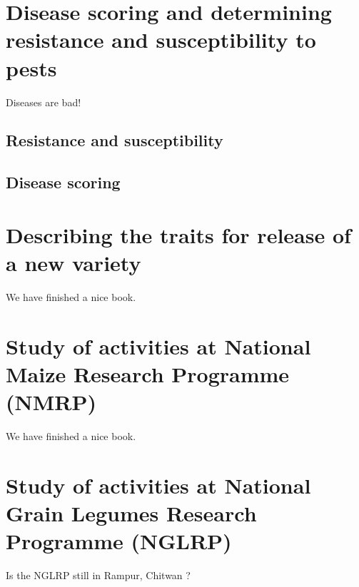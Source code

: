\documentclass[]{article}
\begin{document}
\hypertarget{practical-6}{%
\section{Disease scoring and determining resistance and susceptibility to pests}\label{practical-6}}

Diseases are bad!

\hypertarget{resistance-and-susceptibility}{%
\subsection{Resistance and susceptibility}\label{resistance-and-susceptibility}}

\hypertarget{disease-scoring}{%
\subsection{Disease scoring}\label{disease-scoring}}

\hypertarget{practical-7}{%
\section{Describing the traits for release of a new variety}\label{practical-7}}

We have finished a nice book.

\hypertarget{practical-8}{%
\section{Study of activities at National Maize Research Programme (NMRP)}\label{practical-8}}

We have finished a nice book.

\hypertarget{practical-9}{%
\section{Study of activities at National Grain Legumes Research Programme (NGLRP)}\label{practical-9}}

Is the NGLRP still in Rampur, Chitwan ?
\end{document}
